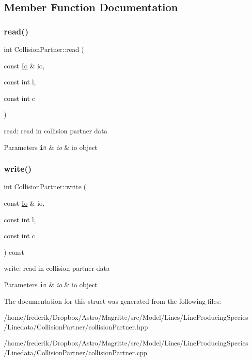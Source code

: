 \subsection{Member Function Documentation}
\mbox{\label{structCollisionPartner_a657070fe480d542b6c1cd55a4d5656b5}} 
\subsubsection{\texorpdfstring{read()}{read()}}
{\footnotesize\ttfamily int Collision\+Partner\+::read (\begin{DoxyParamCaption}\item[{const \mbox{\hyperlink{structIo}{Io}} \&}]{io,  }\item[{const int}]{l,  }\item[{const int}]{c }\end{DoxyParamCaption})}

read\+: read in collision partner data 
\begin{DoxyParams}[1]{Parameters}
\mbox{\tt in}  & {\em io} & io object \\
\hline
\end{DoxyParams}
\mbox{\label{structCollisionPartner_ac561a4be0113365b04fe125e0c14f2b0}} 
\subsubsection{\texorpdfstring{write()}{write()}}
{\footnotesize\ttfamily int Collision\+Partner\+::write (\begin{DoxyParamCaption}\item[{const \mbox{\hyperlink{structIo}{Io}} \&}]{io,  }\item[{const int}]{l,  }\item[{const int}]{c }\end{DoxyParamCaption}) const}

write\+: read in collision partner data 
\begin{DoxyParams}[1]{Parameters}
\mbox{\tt in}  & {\em io} & io object \\
\hline
\end{DoxyParams}


The documentation for this struct was generated from the following files\+:\begin{DoxyCompactItemize}
\item 
/home/frederik/\+Dropbox/\+Astro/\+Magritte/src/\+Model/\+Lines/\+Line\+Producing\+Species/\+Linedata/\+Collision\+Partner/collision\+Partner.\+hpp\item 
/home/frederik/\+Dropbox/\+Astro/\+Magritte/src/\+Model/\+Lines/\+Line\+Producing\+Species/\+Linedata/\+Collision\+Partner/collision\+Partner.\+cpp\end{DoxyCompactItemize}
